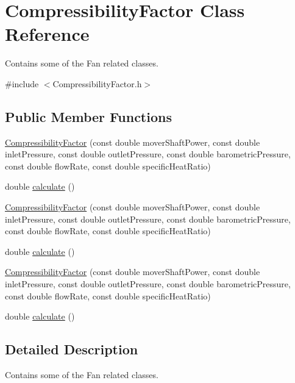 \hypertarget{class_compressibility_factor}{}\section{Compressibility\+Factor Class Reference}
\label{class_compressibility_factor}


Contains some of the Fan related classes.  




{\ttfamily \#include $<$Compressibility\+Factor.\+h$>$}

\subsection*{Public Member Functions}
\begin{DoxyCompactItemize}
\item 
\hyperlink{class_compressibility_factor_afb938d7e72ff7bcf5e979dd51f33e6b8}{Compressibility\+Factor} (const double mover\+Shaft\+Power, const double inlet\+Pressure, const double outlet\+Pressure, const double barometric\+Pressure, const double flow\+Rate, const double specific\+Heat\+Ratio)
\item 
double \hyperlink{class_compressibility_factor_a8bba71f8954f79d3eb704c7ee58a5f47}{calculate} ()
\item 
\hyperlink{class_compressibility_factor_afb938d7e72ff7bcf5e979dd51f33e6b8}{Compressibility\+Factor} (const double mover\+Shaft\+Power, const double inlet\+Pressure, const double outlet\+Pressure, const double barometric\+Pressure, const double flow\+Rate, const double specific\+Heat\+Ratio)
\item 
double \hyperlink{class_compressibility_factor_a8bba71f8954f79d3eb704c7ee58a5f47}{calculate} ()
\item 
\hyperlink{class_compressibility_factor_afb938d7e72ff7bcf5e979dd51f33e6b8}{Compressibility\+Factor} (const double mover\+Shaft\+Power, const double inlet\+Pressure, const double outlet\+Pressure, const double barometric\+Pressure, const double flow\+Rate, const double specific\+Heat\+Ratio)
\item 
double \hyperlink{class_compressibility_factor_a8bba71f8954f79d3eb704c7ee58a5f47}{calculate} ()
\end{DoxyCompactItemize}


\subsection{Detailed Description}
Contains some of the Fan related classes. 

